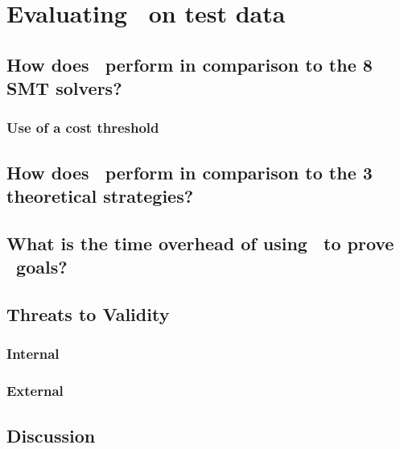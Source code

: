 \chapter{Evaluating \where~on test data}%

\label{Evaluation} %


\section{How does \where~perform in comparison to the 8 SMT solvers?}
\subsection{Use of a cost threshold}

\section{How does \where~perform in comparison to the 3 theoretical strategies?}

\section{What is the time overhead of using \where~to prove \why~goals?}

\section{Threats to Validity}
\subsection{Internal}
\subsection{External}

\section{Discussion}